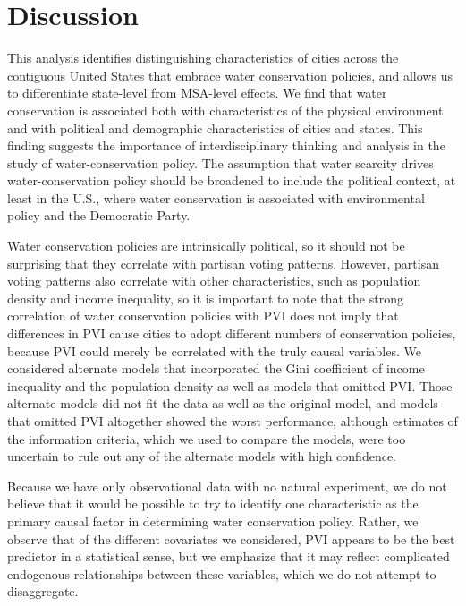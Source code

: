 \documentclass[draft,linenumbers]{agujournal}
\begin{document}
\section{Discussion}

This analysis identifies distinguishing characteristics of cities across the
contiguous United States that embrace water conservation policies, and allows us
to differentiate state-level from MSA-level effects. We find that water
conservation is associated both with characteristics of the physical environment
and with political and demographic
characteristics of cities and states.
This finding suggests the importance of interdisciplinary thinking and
analysis in the study of water-conservation policy. The assumption that
water scarcity drives water-conservation policy should be broadened to include
the political context, at least in the U.S., where water conservation is associated
with environmental policy and the Democratic Party.

Water conservation policies are intrinsically political, so it should not be surprising
that they correlate with partisan voting patterns. However, partisan voting patterns also
correlate with other characteristics, such as population density and income inequality,
so it is important to note that the strong correlation of water conservation policies with
PVI does not imply that differences in PVI cause cities to adopt different numbers of conservation
policies, because PVI could merely be correlated with the truly causal variables.
We considered alternate models that incorporated the Gini coefficient of income inequality
and the population density as well as models that omitted PVI. Those alternate models did not fit the data
as well as the original model, and models that omitted PVI altogether showed the worst performance,
although estimates of the information criteria, which we used to compare the models,
were too uncertain to rule out any of the alternate models with high confidence.

Because we have only observational data with no natural experiment, we do not believe
that it would be possible to try to identify one characteristic as the primary causal factor in
determining water conservation policy. Rather, we observe that of the different covariates we considered,
PVI appears to be the best predictor in a statistical sense, but we emphasize that it may reflect
complicated endogenous relationships between these variables, which we do not attempt to disaggregate.
\end{document}
